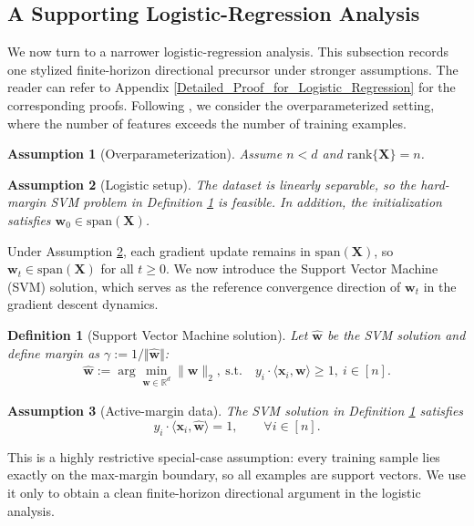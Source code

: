 \documentclass[pdflatex,sn-basic]{sn-jnl}%
\theoremstyle{thmstyleone}%
\newtheorem{definition}{Definition}%
\newtheorem{assumption}{Assumption}%
\begin{document}
\subsection{A Supporting Logistic-Regression Analysis}\label{Logistic_Regression_Model}
We now turn to a narrower logistic-regression analysis. This subsection records one stylized finite-horizon directional precursor under stronger assumptions. The reader can refer to Appendix \ref{Detailed_Proof_for_Logistic_Regression} for the corresponding proofs. Following \citet{implicit_bias_BN}, we consider the overparameterized setting, where the number of features exceeds the number of training examples.
\begin{assumption}[Overparameterization]\label{Overparameterization}
  Assume $n < d$ and $\text{rank}\{\mathbf{X}\} = n$. 
\end{assumption}
\begin{assumption}[Logistic setup]\label{Logistic_Setup}
  The dataset is linearly separable, so the hard-margin SVM problem in Definition \ref{margin} is feasible. In addition, the initialization satisfies $\mathbf{w}_0 \in \text{span}(\mathbf{X})$.
\end{assumption}
Under Assumption \ref{Logistic_Setup}, each gradient update remains in $\text{span}(\mathbf{X})$, so $\mathbf{w}_t \in \text{span}(\mathbf{X})$ for all $t \ge 0$.
We now introduce the Support Vector Machine (SVM) solution, which serves as the 
reference convergence direction of $\mathbf{w}_t$ in the gradient descent dynamics. 
\begin{definition}[Support Vector Machine solution]\label{margin}
  Let $\hat{\mathbf{w}}$ be the SVM solution and define margin as $\gamma := 1 / \Vert \hat{\mathbf{w}} \Vert$:
  \begin{equation*}
  \begin{aligned}
    \hat{\mathbf{w}} := \arg \min_{\mathbf{w} \in \mathbb{R}^{d}} \|\mathbf{w}\|_2, \ 
    \text{s.t.} \quad y_i \cdot \langle \mathbf{x}_i, \mathbf{w} \rangle \geq 1, \  i \in [n].
  \end{aligned}
  \end{equation*}
\end{definition}
\begin{assumption}[Active-margin data]\label{Active_margin_data}
  The SVM solution in Definition \ref{margin} satisfies
  \[
    y_i \cdot \langle \mathbf{x}_i, \hat{\mathbf{w}} \rangle = 1,
    \qquad \forall i \in [n].
  \]
\end{assumption}
This is a highly restrictive special-case assumption: every training sample lies exactly on the max-margin boundary, so all examples are support vectors. We use it only to obtain a clean finite-horizon directional argument in the logistic analysis.
\end{document}
